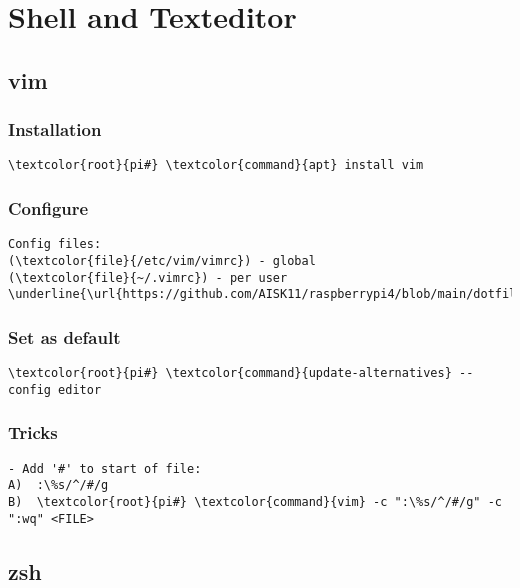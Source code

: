 \documentclass[10pt, a4paper, onecolumn, openany]{book} %
\begin{document}
\chapter{Shell and Texteditor}
\section{vim}
\subsection{Installation}
\begin{Verbatim}[commandchars=\\\{\}]
    \textcolor{root}{pi#} \textcolor{command}{apt} install vim
\end{Verbatim}
\subsection{Configure}
\begin{Verbatim}[commandchars=\\\{\}]
Config files:
(\textcolor{file}{/etc/vim/vimrc}) - global
(\textcolor{file}{~/.vimrc}) - per user
\underline{\url{https://github.com/AISK11/raspberrypi4/blob/main/dotfiles/.vimrc}}
\end{Verbatim}
\subsection{Set as default}
\begin{Verbatim}[commandchars=\\\{\}]
    \textcolor{root}{pi#} \textcolor{command}{update-alternatives} --config editor
\end{Verbatim}
\subsection{Tricks}
\begin{Verbatim}[commandchars=\\\{\}]
- Add '#' to start of file:
A)  :\%s/^/#/g
B)  \textcolor{root}{pi#} \textcolor{command}{vim} -c ":\%s/^/#/g" -c ":wq" <FILE>
\end{Verbatim}

\section{zsh}
\end{document}
